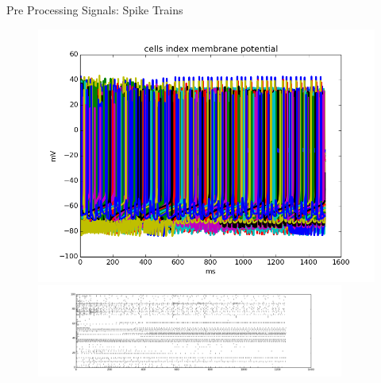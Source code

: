 \documentclass{beamer}
\begin{document}
\begin{frame}{Pre Processing Signals: Spike Trains}
\begin{figure}
\begin{minipage}{0.45\linewidth}
\centering
\includegraphics[scale=0.26]{allMemb.png}

\end{minipage}
\begin{minipage}{0.45\linewidth}
\centering
\includegraphics[width=0.9\textwidth,height=0.36\textheight]{raster.png}

\end{minipage}
\end{figure}
\end{frame}



\end{document}
